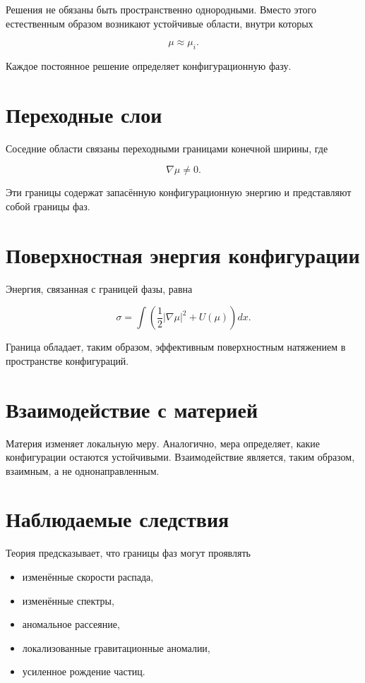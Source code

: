 Решения не обязаны быть пространственно однородными. Вместо этого естественным образом возникают устойчивые области, внутри которых

\[ \mu \approx \mu_i. \]

Каждое постоянное решение определяет конфигурационную фазу.

\section{Переходные слои}

Соседние области связаны переходными границами конечной ширины, где

\[ \nabla\mu\neq0. \]

Эти границы содержат запасённую конфигурационную энергию и представляют собой границы фаз.

\section{Поверхностная энергия конфигурации}

Энергия, связанная с границей фазы, равна

\[ \boxed{ \sigma = \int \left( \frac12 |\nabla\mu|^2 + U(\mu) \right) dx. } \]

Граница обладает, таким образом, эффективным поверхностным натяжением в пространстве конфигураций.

\section{Взаимодействие с материей}

Материя изменяет локальную меру. Аналогично, мера определяет, какие конфигурации остаются устойчивыми. Взаимодействие является, таким образом, взаимным, а не однонаправленным.

\section{Наблюдаемые следствия}

Теория предсказывает, что границы фаз могут проявлять

\begin{itemize}

\item изменённые скорости распада,

\item изменённые спектры,

\item аномальное рассеяние,

\item локализованные гравитационные аномалии,

\item усиленное рождение частиц.

\end{itemize}

